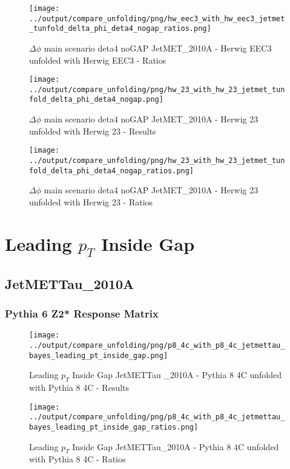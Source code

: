\documentclass[11pt]{book}
\begin{document}
\begin{figure}[ht]
\centering
\texttt{[image: ../output/compare\_unfolding/png/hw\_eec3\_with\_hw\_eec3\_jetmet\_tunfold\_delta\_phi\_deta4\_nogap\_ratios.png]}
\caption{$\Delta\phi$ main scenario deta4 noGAP JetMET\_2010A - Herwig EEC3 unfolded with Herwig EEC3 - Ratios}
\label{hw_eec3_hw_eec3_jetmet_tunfold_delta_phi_deta4_nogap_b}
\end{figure}

\begin{figure}[ht]
\centering
\texttt{[image: ../output/compare\_unfolding/png/hw\_23\_with\_hw\_23\_jetmet\_tunfold\_delta\_phi\_deta4\_nogap.png]}
\caption{$\Delta\phi$ main scenario deta4 noGAP JetMET\_2010A - Herwig 23 unfolded with Herwig 23 - Results}
\label{hw_23_hw_23_jetmet_tunfold_delta_phi_deta4_nogap_a}
\end{figure}

\begin{figure}[ht]
\centering
\texttt{[image: ../output/compare\_unfolding/png/hw\_23\_with\_hw\_23\_jetmet\_tunfold\_delta\_phi\_deta4\_nogap\_ratios.png]}
\caption{$\Delta\phi$ main scenario deta4 noGAP JetMET\_2010A - Herwig 23 unfolded with Herwig 23 - Ratios}
\label{hw_23_hw_23_jetmet_tunfold_delta_phi_deta4_nogap_b}
\end{figure}




\newpage
\chapter{Leading $p_{T}$ Inside Gap}
\section{JetMETTau\_2010A}
\subsection{Pythia 6 Z2* Response Matrix}


\begin{figure}[ht]
\centering
\texttt{[image: ../output/compare\_unfolding/png/p8\_4c\_with\_p8\_4c\_jetmettau\_bayes\_leading\_pt\_inside\_gap.png]}
\caption{Leading $p_{T}$ Inside Gap JetMETTau \_2010A - Pythia 8 4C unfolded with Pythia 8 4C - Results}
\label{p8_p8_jetmettau_bayes_leading_pt_inside_gap_a}
\end{figure}

\begin{figure}[ht]
\centering
\texttt{[image: ../output/compare\_unfolding/png/p8\_4c\_with\_p8\_4c\_jetmettau\_bayes\_leading\_pt\_inside\_gap\_ratios.png]}
\caption{Leading $p_{T}$ Inside Gap JetMETTau\_2010A - Pythia 8 4C unfolded with Pythia 8 4C - Ratios}
\label{p8_p8_jetmettau_bayes_leading_pt_inside_gap_b}
\end{figure}
\end{document}
